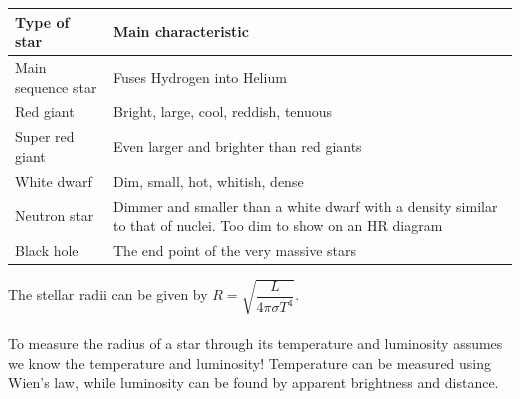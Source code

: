 \documentclass[a4paper,12pt]{article}
\begin{document}
\begin{center}
\begin{tabularx}{\textwidth}{@{}|Y |Y |@{}}
\toprule
\textbf{Type of star} & \textbf{Main characteristic}\\
\midrule
Main sequence star & Fuses Hydrogen into Helium \\
\midrule
Red giant & Bright, large, cool, reddish, tenuous\\
\midrule
Super red giant & Even larger and brighter than red giants\\
\midrule
White dwarf & Dim, small, hot, whitish, dense\\
\midrule
Neutron star & Dimmer and smaller than a white dwarf with a density similar to that of nuclei. Too dim to show on an HR diagram\\
\midrule
Black hole & The end point of the very massive stars\\
\bottomrule
\end{tabularx}
\end{center}
The stellar radii can be given by $R=\sqrt{\dfrac{L}{4\pi\sigma T^4}}$.\\\\
To measure the radius of a star through its temperature and luminosity assumes we know the temperature and luminosity! Temperature can be measured using Wien's law, while luminosity can be found by apparent brightness and distance. 
\end{document}
